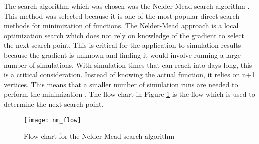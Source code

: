 \label{algrothim_description}

The search algorithm which was chosen was the Nelder-Mead search algorithm \cite{nelder_1965}.  This method was selected because it is one of the most popular direct search methods for minimization of functions.  The Nelder-Mead approach is a local optimization search which does not rely on knowledge of the gradient to select the next search point.  This is critical for the application to simulation results because the gradient is unknown and finding it would involve running a large number of simulations.  With simulation times that can reach into days long, this is a critical consideration.  
Instead of knowing the actual function, it relies on n+1 vertices.  This means that a smaller number of simulation runs are needed to perform the minimization \cite{wang_2011}.
The flow chart in Figure \ref{fig:nm_flow} is the flow which is used to determine the next search point.
\begin{figure}[!htb]
	\centering
	\texttt{[image: nm\_flow]}
	\caption{Flow chart for the Nelder-Mead search algorithm\cite{nelder_1965}}
	\label{fig:nm_flow}
\end{figure}

